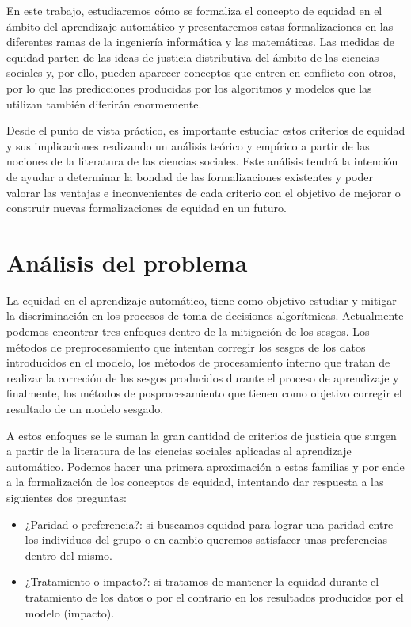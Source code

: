 \documentclass[oneside,openright,titlepage,numbers=noenddot,openany,headinclude,footinclude=true,
cleardoublepage=empty,abstractoff,BCOR=5mm,paper=a4,fontsize=12pt,main=spanish]{scrreprt}
\begin{document}
En este trabajo, estudiaremos cómo se formaliza el concepto de equidad en el ámbito del aprendizaje automático y presentaremos estas formalizaciones en las diferentes ramas de la ingeniería informática y las matemáticas. Las medidas de equidad parten de las ideas de justicia distributiva del ámbito de las ciencias sociales y, por ello, pueden aparecer conceptos que entren en conflicto con otros, por lo que las predicciones producidas por los algoritmos y modelos que las utilizan también diferirán enormemente. 

Desde el punto de vista práctico, es importante estudiar estos criterios de equidad y sus implicaciones realizando un análisis teórico y empírico a partir de las nociones de la literatura de las ciencias sociales. Este análisis tendrá la intención de ayudar a determinar la bondad de las formalizaciones existentes y poder valorar las ventajas e inconvenientes de cada criterio con el objetivo de mejorar o construir nuevas formalizaciones de equidad en un futuro. 

\section{Análisis del problema}

La equidad en el aprendizaje automático, tiene como objetivo estudiar y mitigar la discriminación en los procesos de toma de decisiones algorítmicas. Actualmente podemos encontrar tres enfoques dentro de la mitigación de los sesgos. Los métodos de preprocesamiento que intentan corregir los sesgos de los datos introducidos en el modelo, los métodos de procesamiento interno que tratan de realizar la correción de los sesgos producidos durante el proceso de aprendizaje y finalmente, los métodos de posprocesamiento que tienen como objetivo corregir el resultado de un modelo sesgado.

A estos enfoques se le suman la gran cantidad de criterios de justicia que surgen a partir de la literatura de las ciencias sociales aplicadas al aprendizaje automático. Podemos hacer una primera aproximación a estas familias y por ende a la formalización de los conceptos de equidad, intentando dar respuesta a las siguientes dos preguntas:

\begin{itemize}
    \item ¿Paridad o preferencia?: si buscamos equidad para lograr una paridad entre los individuos del grupo o en cambio queremos satisfacer unas preferencias dentro del mismo.
    \item ¿Tratamiento o impacto?: si tratamos de mantener la equidad durante el tratamiento de los datos o por el contrario en los resultados producidos por el modelo (impacto).
\end{itemize}
\end{document}
